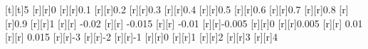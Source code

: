 \begin{psfrags}
[t][t]{5}%
%
[r][r]{0}%
[r][r]{0.1}%
[r][r]{0.2}%
[r][r]{0.3}%
[r][r]{0.4}%
[r][r]{0.5}%
[r][r]{0.6}%
[r][r]{0.7}%
[r][r]{0.8}%
[r][r]{0.9}%
[r][r]{1}%
[r][r]{    -0.02}%
[r][r]{   -0.015}%
[r][r]{    -0.01}%
[r][r]{-0.005}%
[r][r]{0}%
[r][r]{0.005}%
[r][r]{     0.01}%
[r][r]{    0.015}%
[r][r]{-3}%
[r][r]{-2}%
[r][r]{-1}%
[r][r]{0}%
[r][r]{1}%
[r][r]{2}%
[r][r]{3}%
[r][r]{4}%
%
%
\end{psfrags}%
%

